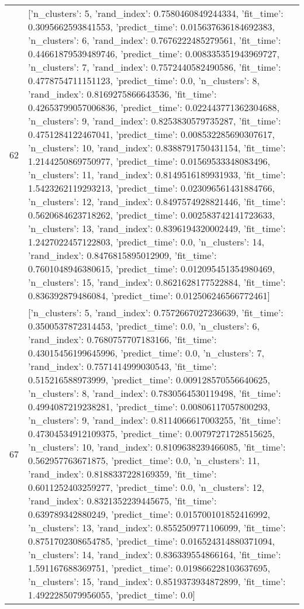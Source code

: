 \begin{tabular}{rl}
62 & [{'n_clusters': 5, 'rand_index': 0.7580460849244334, 'fit_time': 0.3095662593841553, 'predict_time': 0.015637636184692383}, {'n_clusters': 6, 'rand_index': 0.7676222485279561, 'fit_time': 0.44661879539489746, 'predict_time': 0.008335351943969727}, {'n_clusters': 7, 'rand_index': 0.7572440582490586, 'fit_time': 0.4778754711151123, 'predict_time': 0.0}, {'n_clusters': 8, 'rand_index': 0.8169275866643536, 'fit_time': 0.42653799057006836, 'predict_time': 0.022443771362304688}, {'n_clusters': 9, 'rand_index': 0.8253830579735287, 'fit_time': 0.4751284122467041, 'predict_time': 0.008532285690307617}, {'n_clusters': 10, 'rand_index': 0.8388791750431154, 'fit_time': 1.2144250869750977, 'predict_time': 0.01569533348083496}, {'n_clusters': 11, 'rand_index': 0.8149516189931933, 'fit_time': 1.5423262119293213, 'predict_time': 0.023096561431884766}, {'n_clusters': 12, 'rand_index': 0.8497574928821446, 'fit_time': 0.5620684623718262, 'predict_time': 0.002583742141723633}, {'n_clusters': 13, 'rand_index': 0.8396194320002449, 'fit_time': 1.2427022457122803, 'predict_time': 0.0}, {'n_clusters': 14, 'rand_index': 0.8476815895012909, 'fit_time': 0.7601048946380615, 'predict_time': 0.012095451354980469}, {'n_clusters': 15, 'rand_index': 0.8621628177522884, 'fit_time': 0.836392879486084, 'predict_time': 0.012506246566772461}] \\
67 & [{'n_clusters': 5, 'rand_index': 0.7572667027236639, 'fit_time': 0.3500537872314453, 'predict_time': 0.0}, {'n_clusters': 6, 'rand_index': 0.7680757707183166, 'fit_time': 0.43015456199645996, 'predict_time': 0.0}, {'n_clusters': 7, 'rand_index': 0.7571414999030543, 'fit_time': 0.515216588973999, 'predict_time': 0.009128570556640625}, {'n_clusters': 8, 'rand_index': 0.7830564530119498, 'fit_time': 0.4994087219238281, 'predict_time': 0.00806117057800293}, {'n_clusters': 9, 'rand_index': 0.8114066617003255, 'fit_time': 0.47304534912109375, 'predict_time': 0.00797271728515625}, {'n_clusters': 10, 'rand_index': 0.8109638239466085, 'fit_time': 0.562957763671875, 'predict_time': 0.0}, {'n_clusters': 11, 'rand_index': 0.8188337228169359, 'fit_time': 0.6011252403259277, 'predict_time': 0.0}, {'n_clusters': 12, 'rand_index': 0.8321352239445675, 'fit_time': 0.639789342880249, 'predict_time': 0.015700101852416992}, {'n_clusters': 13, 'rand_index': 0.8552509771106099, 'fit_time': 0.8751702308654785, 'predict_time': 0.016524314880371094}, {'n_clusters': 14, 'rand_index': 0.836339554866164, 'fit_time': 1.591167688369751, 'predict_time': 0.019866228103637695}, {'n_clusters': 15, 'rand_index': 0.8519373934872899, 'fit_time': 1.4922285079956055, 'predict_time': 0.0}] \\

\end{tabular}
